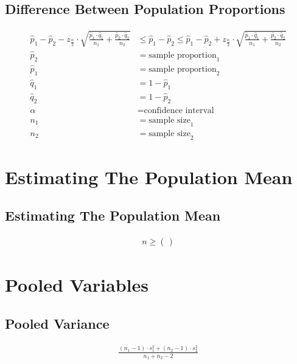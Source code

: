 \documentclass{article}
\begin{document}
\subsection{Difference Between Population Proportions}
\begin{align*}
    \hat{p}_{1} - \hat{p}_2 - z_{\frac{\alpha}{2}} \cdot \sqrt{ \frac{\hat{p}_{1} \cdot \hat{q}_{1}}{n_{1}} + \frac{\hat{p}_{2} \cdot \hat{q}_{2}}{n_{2}} }  &\leq  \hat{p}_{1} - \hat{p}_{2} \leq \hat{p}_{1} - \hat{p}_2 + z_{\frac{\alpha}{2}} \cdot \sqrt{ \frac{\hat{p}_{1} \cdot \hat{q}_{1}}{n_{1}} + \frac{\hat{p}_{2} \cdot \hat{q}_{2}}{n_{2}} } \\ 
    \hat{p}_{2} &= \text{sample proportion}_{1}\\
    \hat{p}_{1} &= \text{sample proportion}_{2}\\
    \hat{q}_{1} &= 1 - \hat{p}_{1}\\ 
    \hat{q}_{2} &= 1 - \hat{p}_{2}\\ 
    \alpha &= \text{confidence interval}\\ 
    n_{1} &= \text{sample size}_{1}\\
    n_{2} &= \text{sample size}_{2}
\end{align*}

\section{Estimating The Population Mean}

\subsection{Estimating The Population Mean}

\begin{align*}
    n \geq \left( \frac{}{} \right)
\end{align*}

\section{Pooled Variables}

\subsection{Pooled Variance}

\begin{align*}
    \frac{(n_{1}-1) \cdot s^2_{1} + (n_{2}-1) \cdot s^2_{2}}{n_{1} + n_{2} - 2}
\end{align*}
\end{document}
